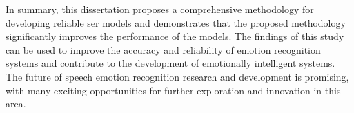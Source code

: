 In summary, this dissertation proposes a comprehensive methodology for developing reliable \ac{ser} models and demonstrates that the proposed methodology significantly improves the performance of the models. The findings of this study can be used to improve the accuracy and reliability of emotion recognition systems and contribute to the development of emotionally intelligent systems. The future of speech emotion recognition research and development is promising, with many exciting opportunities for further exploration and innovation in this area.
